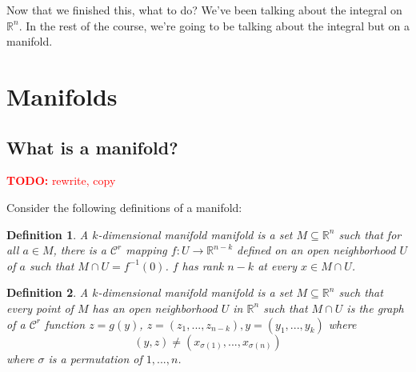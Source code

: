 \documentclass{article}
\newtheorem{definition}{Definition}
\newcommand{\reals}[0]{\mathbb{R}}
\newcommand{\mc}[1]{\mathcal{#1}}
\newcommand{\TODO}[1]{\textcolor{red}{\textbf{TODO:} #1}}
\begin{document}
Now that we finished this, what to do? We've been talking about the integral on \(\reals^n\). In the rest of the course, we're going to be talking about the integral but on a manifold.

\section{Manifolds}

\subsection{What is a manifold?}

\TODO{rewrite, copy}


Consider the following definitions of a manifold:
\begin{definition}
  A \(k\)-dimensional manifold manifold is a set \(M \subseteq \reals^n\) such that for all \(a \in M\), there is a \(\mc{C}^r\) mapping \(f: U \to \reals^{n - k}\) defined on an open neighborhood \(U\) of \(a\) such that \(M \cap U = f^{-1}(0)\). \(f\) has rank \(n - k\) at every \(x \in M \cap U\).
  \label{def:manifold1}
\end{definition}

\begin{definition}
  A \(k\)-dimensional manifold manifold is a set \(M \subseteq \reals^n\) such that every point of \(M\) has an open neighborhood \(U\) in \(\reals^n\) such that \(M \cap U\) is the graph of a \(\mc{C}^r\) function \(z = g(y)\), \(z = (z_1,...,z_{n - k}), y = (y_1,...,y_k)\) where
  \begin{equation}(y, z) \neq (x_{\sigma(1)},...,x_{\sigma(n)})\end{equation}
  where \(\sigma\) is a permutation of \(1,...,n\).
  \label{def:manifold2}
\end{definition}
\end{document}

